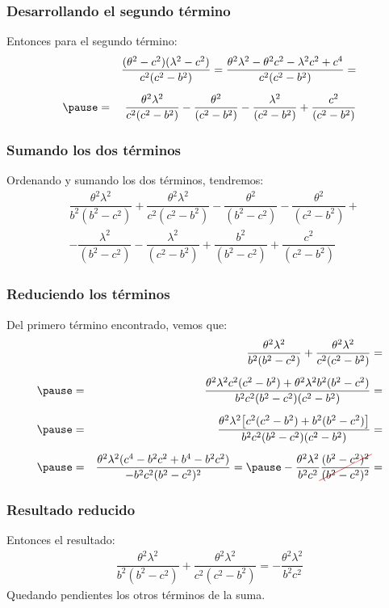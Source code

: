 \documentclass[12pt]{beamer}
\begin{document}
\begin{frame}
\frametitle{Desarrollando el segundo término}
Entonces para el segundo término:
\pause
\begin{eqnarray*}
&{}&\dfrac{(\theta^{2} - c^{2})(\lambda^{2} - c^{2})}{c^{2}(c^{2} - b^{2})} = \dfrac{\theta^{2} \lambda^{2} - \theta^2 c^{2} - \lambda^{2} c^{2} + c^{4}}{c^{2}(c^{2} - b^{2})} = \\[0.5em] \pause
&=& \dfrac{\theta^{2} \lambda^{2}}{c^{2}(c^{2} - b^{2})} - \dfrac{\theta^{2}}{(c^{2} - b^{2})} - \dfrac{\lambda^{2}}{(c^{2} - b^{2})} + \dfrac{c^{2}}{(c^{2} - b^{2})}
\end{eqnarray*}
\end{frame}
\begin{frame}
\frametitle{Sumando los dos términos}
Ordenando y sumando los dos términos, tendremos:
\pause
\begin{align*}
&\dfrac{\theta^{2} \lambda^{2}}{b^{2}(b^{2} - c^{2})} + \dfrac{\theta^{2} \lambda^{2}}{c^{2}(c^{2} - b^{2})} - \dfrac{\theta^{2}}{(b^{2} - c^{2})} - \dfrac{\theta^{2}}{(c^{2} - b^{2})} + \\[0.5em] 
&- \dfrac{\lambda^{2}}{(b^{2} - c^{2})} - \dfrac{\lambda^{2}}{(c^{2} - b^{2})} + \dfrac{b^{2}}{(b^{2} - c^{2})} + \dfrac{c^{2}}{(c^{2} - b^{2})}
\end{align*}
\end{frame}
\begin{frame}
\frametitle{Reduciendo los términos}
Del primero término encontrado, vemos que:
\pause
\begin{eqnarray*}
&{}&\dfrac{\theta^{2} \lambda^{2}}{b^{2}(b^{2} - c^{2})} + \dfrac{\theta^{2} \lambda^{2}}{c^{2}(c^{2} - b^{2})} = \\[0.5em] \pause
&=& \dfrac{\theta^{2} \lambda^{2} c^{2} (c^{2} - b^{2}) + \theta^{2} \lambda^{2} b^{2} (b^{2} - c^{2})}{b^{2} c^{2}(b^{2} - c^{2})(c^{2} - b^{2})} = \\[0.5em] \pause
&=& \dfrac{\theta^{2} \lambda^{2} \big[ c^{2} (c^{2} - b^{2}) + b^{2} (b^{2} - c^{2}) \big]}{b^{2} c^{2}(b^{2} - c^{2})(c^{2} - b^{2})} = \\[0.5em] \pause
&=& \dfrac{\theta^{2} \lambda^{2} (c^{4} - b^{2} c^{2} + b^{4} -b^{2} c^{2})}{-b^{2} c^{2} (b^{2} - c^{2})^{2}} = \pause - \dfrac{\theta^{2} \lambda^{2}}{b^{2} c^{2}} \Cancel[red]{\dfrac{(b^{2} - c^{2})^{2}}{(b^{2} - c^{2})^{2}}} =
\end{eqnarray*}
\end{frame}
\begin{frame}
\frametitle{Resultado reducido}
Entonces el resultado:
\pause
\begin{align*}
\dfrac{\theta^{2} \lambda^{2}}{b^{2}(b^{2} - c^{2})} + \dfrac{\theta^{2} \lambda^{2}}{c^{2}(c^{2} - b^{2})} = - \dfrac{\theta^{2} \lambda^{2}}{b^{2} c^{2}}
\end{align*}
\pause
Quedando pendientes los otros términos de la suma.
\end{frame}
\end{document}
